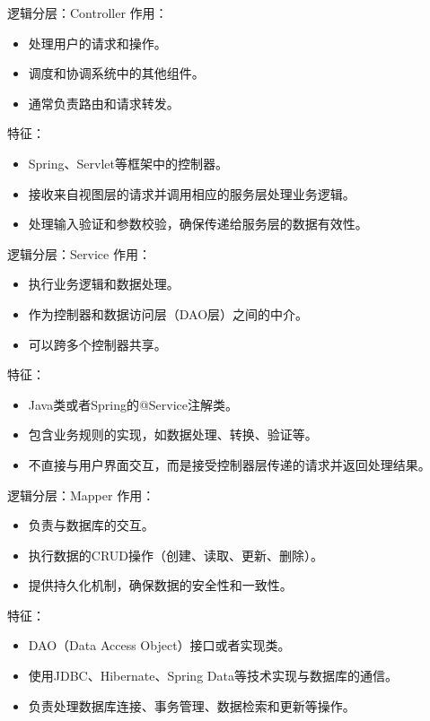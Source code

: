 \documentclass{beamer}
\begin{document}
\begin{frame}{逻辑分层：Controller}
作用：
    \begin{itemize}
    \item 处理用户的请求和操作。
    \item 调度和协调系统中的其他组件。
    \item 通常负责路由和请求转发。
    \end{itemize}
特征：
    \begin{itemize}
    \item Spring、Servlet等框架中的控制器。
    \item 接收来自视图层的请求并调用相应的服务层处理业务逻辑。
    \item 处理输入验证和参数校验，确保传递给服务层的数据有效性。
    \end{itemize}
\end{frame}
\begin{frame}{逻辑分层：Service}
作用：
    \begin{itemize}
    \item 执行业务逻辑和数据处理。
    \item 作为控制器和数据访问层（DAO层）之间的中介。
    \item 可以跨多个控制器共享。
    \end{itemize}
特征：
    \begin{itemize}
    \item Java类或者Spring的@Service注解类。
    \item 包含业务规则的实现，如数据处理、转换、验证等。
    \item 不直接与用户界面交互，而是接受控制器层传递的请求并返回处理结果。
    \end{itemize}
\end{frame}
\begin{frame}{逻辑分层：Mapper}
作用：
    \begin{itemize}
    \item 负责与数据库的交互。
    \item 执行数据的CRUD操作（创建、读取、更新、删除）。
    \item 提供持久化机制，确保数据的安全性和一致性。
    \end{itemize}
特征：
    \begin{itemize}
    \item DAO（Data Access Object）接口或者实现类。
    \item 使用JDBC、Hibernate、Spring Data等技术实现与数据库的通信。
    \item 负责处理数据库连接、事务管理、数据检索和更新等操作。
    \end{itemize}
\end{frame}
\end{document}
